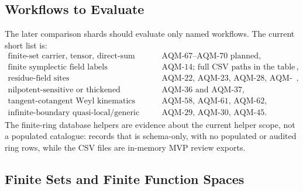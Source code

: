\subsection{Workflows to Evaluate}

The later comparison shards should evaluate only named workflows.  The
current short list is:
\[
\begin{array}{ll}
\text{finite-set carrier, tensor, direct-sum workflows} & \text{AQM-67--AQM-70 planned},\\
\text{finite symplectic field labels} & \text{AQM-14; full CSV paths in the table below},\\
\text{residue-field sites} & \text{AQM-22, AQM-23, AQM-28, AQM-40},\\
\text{nilpotent-sensitive or thickened Frobenius layer} & \text{AQM-36 and AQM-37},\\
\text{tangent-cotangent Weyl kinematics} & \text{AQM-58, AQM-61, AQM-62},\\
\text{infinite-boundary quasi-local/generic layers} & \text{AQM-29, AQM-30, AQM-45}.
\end{array}
\]
The finite-ring database helpers are evidence about the current helper scope,
not a populated catalogue: 
records that  is schema-only, with no populated or audited ring
rows, while the CSV files are in-memory MVP review exports.

\subsection{Finite Sets and Finite Function Spaces}

